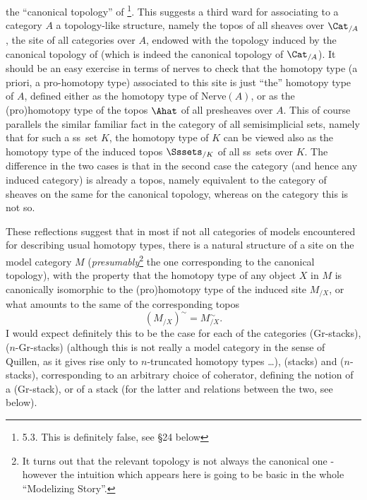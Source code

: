 the ``canonical topology'' of \Cat{}\footnote{5.3. This is definitely false, see §24 below}. This suggests a third ward for associating
to a category $A$ a topology-like structure, namely the topos of all
sheaves over $\Cat_{/A}$, the site of all categories over $A$,
endowed with the topology induced by the canonical topology of \Cat{}
(which is indeed the canonical topology of $\Cat_{/A}$). It should be
an easy exercise in terms of nerves to check that the homotopy type (a
priori, a pro-homotopy type) associated to this site is just ``the''
homotopy type of $A$, defined either as the homotopy type of
Nerve$(A)$, or as the (pro)homotopy type of the topos $\Ahat$ of
all presheaves over $A$. This of course parallels the similar familiar
fact in the category \Sssets{} of all semisimplicial sets, namely that
for such a ss~set $K$, the homotopy type of $K$ can be viewed also as
the homotopy type of the induced topos $\Sssets_{/K}$ of all ss~sets
over $K$. The difference in the two cases is that in the second
case the category \Sssets{} (and hence any induced
category) is already a topos, namely equivalent to the category of
sheaves on the same for the canonical topology, whereas on the
category \Cat{} this is not so.

These reflections suggest that in most if not all categories of models
encountered for describing usual homotopy types, there is a natural
structure of a site on the model category $M$
(\emph{presumably}\footnote{It turns out that the relevant topology is not always the canonical one - however the intuition which appears here is going to be basic in the whole ``Modelizing Story''.} the
one corresponding to the canonical topology), with the property that
the homotopy type of any object $X$ in $M$ is canonically isomorphic
to the (pro)homotopy type of the induced site $M_{/X}$, or what
amounts to the same of the corresponding topos
\[ (M_{/X})^\sim = M^\sim_{/X}.\]
I would expect definitely this to be the case for each of the
categories (Gr-stacks), ($n$-Gr-stacks) (although this is not really a
model category in the sense of Quillen, as it gives rise only to
$n$-truncated homotopy types \ldots), (stacks) and ($n$-stacks),
corresponding to an arbitrary choice of coherator, defining the notion
of a (Gr-stack), or of a stack (for the latter and relations between
the two, see below).

